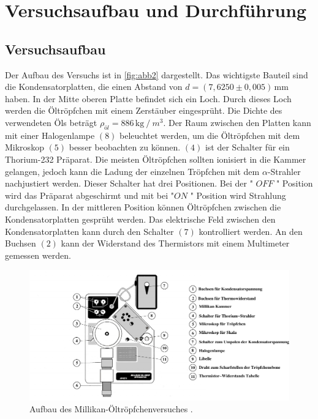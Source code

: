 \section{Versuchsaufbau und Durchführung}
\label{sec:Versuchsaufbau und Durchführung}

\subsection{Versuchsaufbau}
Der Aufbau des Versuchs ist in \autoref{fig:abb2} dargestellt. Das wichtigste Bauteil sind die Kondensatorplatten, die einen Abstand von $d = (7,6250 \pm 0,005) \, \unit{\milli\meter}$ haben.
In der Mitte oberen Platte befindet sich ein Loch. Durch dieses Loch werden die Öltröpfchen mit einem Zerstäuber eingesprüht.
Die Dichte des verwendeten Öls beträgt $\rho_{öl} = 886 \, \unit{\kilo\gram} \mathbin{/} m^3$. Der Raum zwischen den Platten kann mit einer Halogenlampe $(8)$ beleuchtet werden, um die Öltröpfchen mit dem Mikroskop $(5)$ besser beobachten zu können.
$(4)$ ist der Schalter für ein Thorium-232 Prä­pa­rat. Die meisten Öltröpfchen sollten ionisiert in die Kammer gelangen, jedoch kann die Ladung der einzelnen Tröpfchen mit dem $\alpha$-Strahler nachjustiert werden. Dieser Schalter hat drei Positionen.
Bei der " $OFF$ " Position wird das Prä­pa­rat abgeschirmt und mit bei "$ON$ " Position wird Strahlung durchgelassen. In der mittleren Position können Öltröpfchen zwischen die Kondensatorplatten gesprüht werden.
Das elektrische Feld zwischen den Kondensatorplatten kann durch den Schalter $(7)$ kontrolliert werden.
An den Buchsen $(2)$ kann der Widerstand des Thermistors mit einem Multimeter gemessen werden.


\begin{figure}[H]
    \centering
    \includegraphics[width=1.0\textwidth]{figures/Abb2.pdf}
    \caption{Aufbau des Millikan-Öltröpfchenversuches \cite{ap12}.}
    \label{fig:abb2}
\end{figure}

